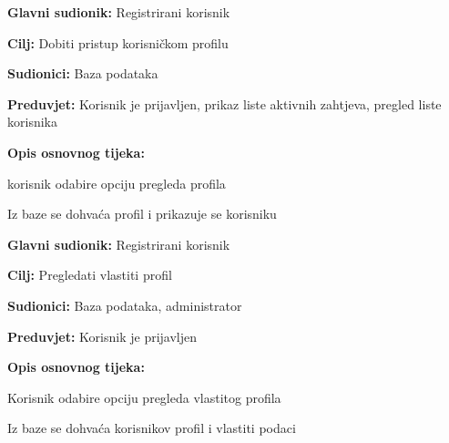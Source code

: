 \noindent {}
\begin{packed_item}
	
	\item \textbf{Glavni sudionik: } Registrirani korisnik
	\item  \textbf{Cilj:} Dobiti pristup korisničkom profilu
	\item  \textbf{Sudionici:} Baza podataka
	\item  \textbf{Preduvjet:} Korisnik je prijavljen, prikaz liste aktivnih zahtjeva, pregled liste korisnika
	\item  \textbf{Opis osnovnog tijeka:}
	
	\item[] \begin{packed_enum}
		
		\item korisnik odabire opciju pregleda profila
		\item Iz baze se dohvaća profil i prikazuje se korisniku
	\end{packed_enum}
\end{packed_item}
\noindent {}
\begin{packed_item}
	
	\item \textbf{Glavni sudionik: } Registrirani korisnik
	\item  \textbf{Cilj:} Pregledati vlastiti profil
	\item  \textbf{Sudionici:} Baza podataka, administrator
	\item  \textbf{Preduvjet:} Korisnik je prijavljen
	\item  \textbf{Opis osnovnog tijeka:}
	
	\item[] \begin{packed_enum}
		
		\item Korisnik odabire opciju pregleda vlastitog profila
		\item Iz baze se dohvaća korisnikov profil i vlastiti podaci
	\end{packed_enum}
\end{packed_item}
\noindent {}
